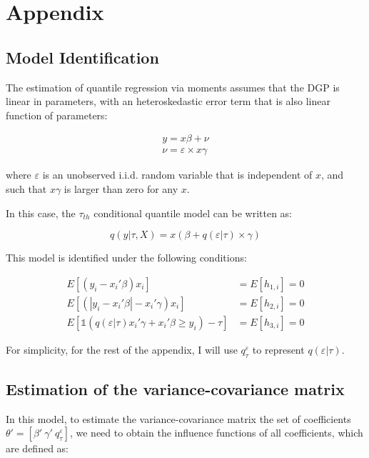 \documentclass[
  authoryear,
  preprint,
  1p]{elsarticle}
\begin{document}
\hypertarget{appendix}{%
\section{Appendix}\label{appendix}}

\hypertarget{model-identification}{%
\subsection{Model Identification}\label{model-identification}}

The estimation of quantile regression via moments assumes that the DGP
is linear in parameters, with an heteroskedastic error term that is also
linear function of parameters:

\[\begin{aligned}
y = x\beta + \nu \\
\nu = \varepsilon \times x\gamma
\end{aligned}
\]

where \(\varepsilon\) is an unobserved i.i.d. random variable that is
independent of \(x\), and such that \(x\gamma\) is larger than zero for
any \(x\).

In this case, the \(\tau_{th}\) conditional quantile model can be
written as:

\[q(y|\tau,X) = x(\beta + q(\varepsilon |\tau) \times \gamma)\]

This model is identified under the following conditions:

\[\begin{aligned}
  E[(y_i-x_i'\beta)x_i ]  &= E[h_{1,i}]=0 \\
  E[ (|y_i-x_i'\beta|-x_i' \gamma) x_i ] &=E[h_{2,i}]=0 \\
  E\left[  \mathbb{1}\left( q(\varepsilon|\tau) x_i'\gamma +x_i'\beta\geq  y_i  \right) - \tau \right] 
   &=E[h_{3,i}]=0 
\end{aligned}
\]

For simplicity, for the rest of the appendix, I will use
\(q^\varepsilon_\tau\) to represent \(q(\varepsilon |\tau)\).

\hypertarget{estimation-of-the-variance-covariance-matrix}{%
\subsection{Estimation of the variance-covariance
matrix}\label{estimation-of-the-variance-covariance-matrix}}

In this model, to estimate the variance-covariance matrix the set of
coefficients \(\theta'=[\beta' \ \gamma' \ q^\varepsilon_\tau]\), we
need to obtain the influence functions of all coefficients, which are
defined as:
\end{document}
